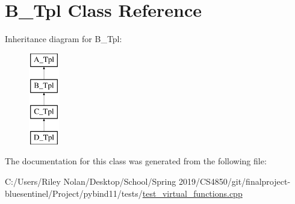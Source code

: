 \hypertarget{class_b___tpl}{}\section{B\+\_\+\+Tpl Class Reference}
\label{class_b___tpl}
Inheritance diagram for B\+\_\+\+Tpl\+:\begin{figure}[H]
\begin{center}
\leavevmode
\includegraphics[height=4.000000cm]{class_b___tpl}
\end{center}
\end{figure}


The documentation for this class was generated from the following file\+:\begin{DoxyCompactItemize}
\item 
C\+:/\+Users/\+Riley Nolan/\+Desktop/\+School/\+Spring 2019/\+C\+S4850/git/finalproject-\/bluesentinel/\+Project/pybind11/tests/\mbox{\hyperlink{test__virtual__functions_8cpp}{test\+\_\+virtual\+\_\+functions.\+cpp}}\end{DoxyCompactItemize}
